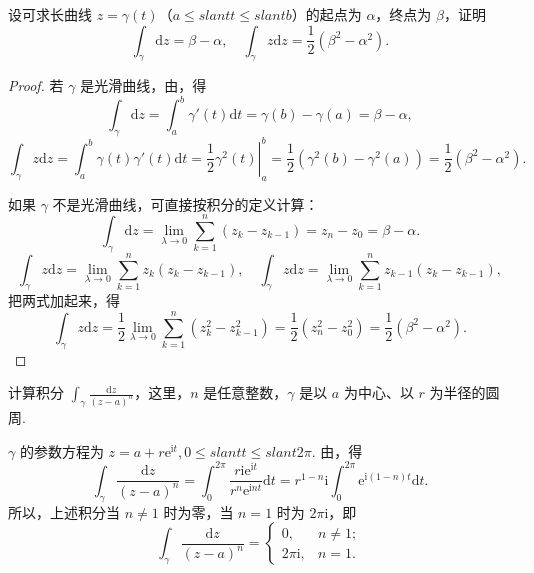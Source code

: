\documentclass[../../main.tex]{subfiles}
\begin{document}
\begin{example}\label{example:例3.1.3}
设可求长曲线 \( z = \gamma(t) \)（\( a \leqslant slant t \leqslant slant b \)）的起点为 \( \alpha \)，终点为 \( \beta \)，证明
\[
\int_\gamma \mathrm{d}z = \beta - \alpha,
\quad
\int_\gamma z \mathrm{d}z = \frac{1}{2}(\beta^2 - \alpha^2).
\]
\end{example}
\begin{proof}
若 \( \gamma \) 是光滑曲线，由，得
\[
\int_\gamma \mathrm{d}z = \int_a^b \gamma'(t)\mathrm{d}t
= \gamma(b) - \gamma(a)
= \beta - \alpha,
\]
\[
\int_\gamma z \mathrm{d}z = \int_a^b \gamma(t)\gamma'(t)\mathrm{d}t
= \left. \frac{1}{2}\gamma^2(t) \right|_a^b
= \frac{1}{2}(\gamma^2(b) - \gamma^2(a))
= \frac{1}{2}(\beta^2 - \alpha^2).
\]

如果 \( \gamma \) 不是光滑曲线，可直接按积分的定义计算：
\[
\int_\gamma \mathrm{d}z = \lim_{\lambda \to 0} \sum_{k = 1}^n (z_k - z_{k - 1})
= z_n - z_0
= \beta - \alpha.
\]
\[
\int_\gamma z \mathrm{d}z = \lim_{\lambda \to 0} \sum_{k = 1}^n z_k(z_k - z_{k - 1}),
\quad
\int_\gamma z \mathrm{d}z = \lim_{\lambda \to 0} \sum_{k = 1}^n z_{k - 1}(z_k - z_{k - 1}),
\]
把两式加起来，得
\[
\int_\gamma z \mathrm{d}z = \frac{1}{2} \lim_{\lambda \to 0} \sum_{k = 1}^n (z_k^2 - z_{k - 1}^2)
= \frac{1}{2}(z_n^2 - z_0^2)
= \frac{1}{2}(\beta^2 - \alpha^2).
\]
\end{proof}

\begin{example}\label{example:例3.1.4}
计算积分 \( \int_\gamma \frac{\mathrm{d}z}{(z - a)^n} \)，这里，\( n \) 是任意整数，\( \gamma \) 是以 \( a \) 为中心、以 \( r \) 为半径的圆周.
\end{example}
\begin{solution}
\( \gamma \) 的参数方程为 \( z = a + r\mathrm{e}^{\mathrm{i}t}, 0 \leqslant slant t \leqslant slant 2\pi \). 由，得
\[
\int_\gamma \frac{\mathrm{d}z}{(z - a)^n} = \int_0^{2\pi} \frac{r\mathrm{i}\mathrm{e}^{\mathrm{i}t}}{r^n\mathrm{e}^{\mathrm{i}nt}}\mathrm{d}t
= r^{1 - n}\mathrm{i} \int_0^{2\pi} \mathrm{e}^{\mathrm{i}(1 - n)t}\mathrm{d}t.
\]
所以，上述积分当 \( n \neq 1 \) 时为零，当 \( n = 1 \) 时为 \( 2\pi\mathrm{i} \)，即
\[
\int_\gamma \frac{\mathrm{d}z}{(z - a)^n} = 
\begin{cases} 
0, & n \neq 1; \\
2\pi\mathrm{i}, & n = 1.
\end{cases}
\]
\end{solution}
\end{document}
